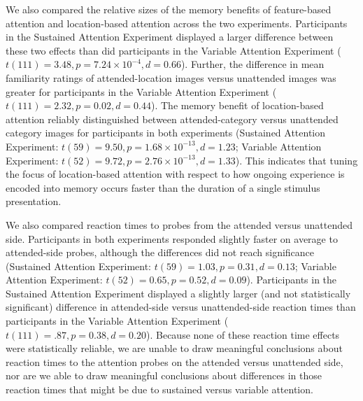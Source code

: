 \documentclass[english]{article}
\begin{document}
We also compared the relative sizes of the memory benefits of feature-based
attention and location-based attention across the two experiments. Participants
in the Sustained Attention Experiment displayed a larger difference between
these two effects than did participants in the Variable Attention Experiment
($t(111) = 3.48, p = 7.24 \times 10^{-4}, d = 0.66$). Further, the difference
in mean familiarity ratings of attended-location images versus unattended
images was greater for participants in the Variable Attention Experiment
($t(111) = 2.32, p = 0.02, d = 0.44$). The memory benefit of location-based
attention reliably distinguished between attended-category versus unattended
category images for participants in both experiments (Sustained Attention
Experiment: $t(59) = 9.50, p = 1.68 \times 10^{-13}, d = 1.23$; Variable
Attention Experiment: $t(52) = 9.72, p = 2.76 \times 10^{-13}, d = 1.33$). This
indicates that tuning the focus of location-based attention with respect to how
ongoing experience is encoded into memory occurs faster than the duration of a
single stimulus presentation.

We also compared reaction times to probes from the attended versus unattended
side. Participants in both experiments responded slightly faster on average to
attended-side probes, although the differences did not reach significance
(Sustained Attention Experiment: $t(59) = 1.03, p = 0.31, d = 0.13$; Variable
Attention Experiment: $t(52) = 0.65, p = 0.52, d = 0.09$). Participants in the
Sustained Attention Experiment displayed a slightly larger (and not
statistically significant) difference in attended-side versus unattended-side
reaction times than participants in the Variable Attention Experiment ($t(111)
= .87, p = 0.38, d = 0.20$). Because none of these reaction time effects were
statistically reliable, we are unable to draw meaningful conclusions about
reaction times to the attention probes on the attended versus unattended side,
nor are we able to draw meaningful conclusions about differences in those
reaction times that might be due to sustained versus variable attention.
\end{document}
